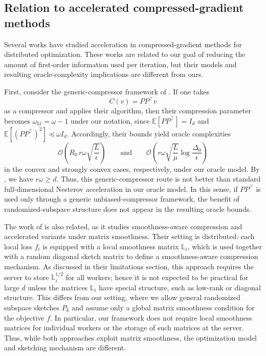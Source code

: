 \documentclass[10pt]{article}
\newcommand{\E}{\mathbb{E}}
\newcommand{\Lmat}{\mathbb{L}}
\begin{document}
\subsection{Relation to accelerated compressed-gradient methods}
\label{app:compressed-gradient-comparison}

Several works have studied acceleration in compressed-gradient methods for distributed optimization.
These works are related to our goal of reducing the amount of first-order information used per iteration,
but their models and resulting oracle-complexity implications are different from ours.

First, consider the generic-compressor framework of \citet{li2020acgd}.
If one takes
\[
C(v)=PP^\top v
\]
as a compressor and applies their algorithm, then their compression parameter becomes
\(\omega_{\mathrm{Li}}=\omega-1\) under our notation, since
\(\E[PP^\top]=I_d\) and \(\E[(PP^\top)^2]\preceq \omega I_d\).
Accordingly, their bounds yield oracle complexities
\[
\mathcal{O}\!\left(R_0\,r\omega\sqrt{\frac{L}{\epsilon}}\right)
\qquad\text{and}\qquad
\mathcal{O}\!\left(r\omega\sqrt{\frac{L}{\mu}}\log\frac{\Delta_0}{\epsilon}\right)
\]
in the convex and strongly convex cases, respectively, under our oracle model.
By , we have \(r\omega\ge d\).
Thus, this generic-compressor route is not better than standard full-dimensional Nesterov acceleration
in our oracle model.
In this sense, if \(PP^\top\) is used only through a generic unbiased-compressor framework,
the benefit of randomized-subspace structure does not appear in the resulting oracle bounds.

The work of \citet{safaryan2021smoothness} is also related, as it studies smoothness-aware compression
and accelerated variants under matrix smoothness.
Their setting is distributed: each local loss \(f_i\) is equipped with a local smoothness matrix \(\Lmat_i\),
which is used together with a random diagonal sketch matrix to define a smoothness-aware compression mechanism.
As discussed in their limitations section, this approach requires the server to store \(\Lmat_i^{1/2}\)
for all workers; hence it is not expected
to be practical for large \(d\) unless the matrices \(\Lmat_i\) have special structure, such as low-rank or diagonal structure.
This differs from our setting, where we allow general randomized subspace sketches \(P_k\)
and assume only a global matrix smoothness condition for the objective \(f\).
In particular, our framework does not require local smoothness matrices for individual workers
or the storage of such matrices at the server.
Thus, while both approaches exploit matrix smoothness, the optimization model
and sketching mechanism are different.
\end{document}
